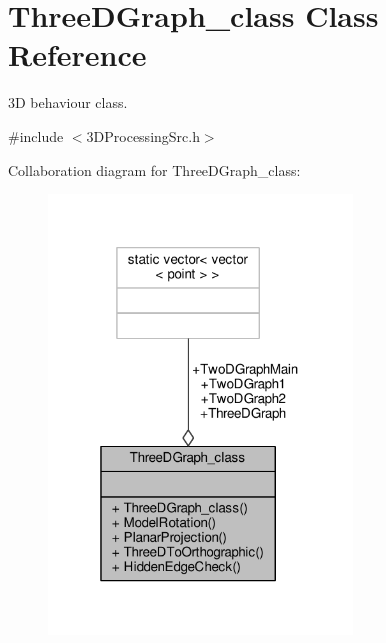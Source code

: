 \hypertarget{classThreeDGraph__class}{}\section{Three\+D\+Graph\+\_\+class Class Reference}
\label{classThreeDGraph__class}


3D behaviour class.  




{\ttfamily \#include $<$3\+D\+Processing\+Src.\+h$>$}



Collaboration diagram for Three\+D\+Graph\+\_\+class\+:\nopagebreak
\begin{figure}[H]
\begin{center}
\leavevmode
\includegraphics[width=229pt]{classThreeDGraph__class__coll__graph}
\end{center}
\end{figure}
